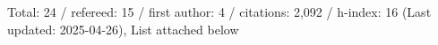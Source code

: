 Total: 24 / refereed: 15 / first author: 4 / citations: 2,092 / h-index: 16 (Last updated: 2025-04-26), List attached below